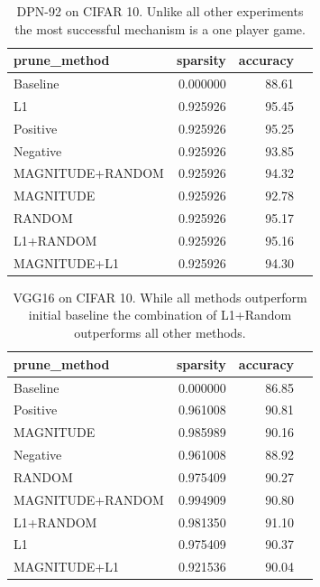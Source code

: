 \documentclass[runningheads]{llncs}
\begin{document}
\begin{table}[h]
\begin{tabular}{|l|r|r|r|}
\hline
     prune\_method &  sparsity &  accuracy \\ \hline
   Baseline  &  0.000000 &     88.61 \\ \hline
               L1 &  0.925926 &     95.45 \\ \hline
         Positive &  0.925926 &     95.25 \\ \hline
         Negative &  0.925926 &     93.85 \\ \hline
 MAGNITUDE+RANDOM &  0.925926 &     94.32 \\ \hline
        MAGNITUDE &  0.925926 &     92.78 \\ \hline
           RANDOM &  0.925926 &     95.17 \\ \hline
        L1+RANDOM &  0.925926 &     95.16 \\ \hline
     MAGNITUDE+L1 &  0.925926 &     94.30 \\ \hline 
\end{tabular}
\label{tab:cifar10-DPN92}
\caption{DPN-92 on CIFAR 10. Unlike all other experiments the most successful mechanism is a one player game.}
\end{table}

\begin{table}[h]
\begin{tabular}{|l|r|r|r|}
\hline
     prune\_method &  sparsity &  accuracy \\ \hline 
     Baseline &  0.000000 &     86.85 \\ \hline
         Positive &  0.961008 &     90.81 \\ \hline
        MAGNITUDE &  0.985989 &     90.16 \\ \hline
         Negative &  0.961008 &     88.92 \\ \hline
           RANDOM &  0.975409 &     90.27 \\ \hline
 MAGNITUDE+RANDOM &  0.994909 &     90.80 \\ \hline
        L1+RANDOM &  0.981350 &     91.10 \\ \hline
               L1 &  0.975409 &     90.37 \\ \hline
     MAGNITUDE+L1 &  0.921536 &     90.04 \\ \hline
\end{tabular}
\label{tab:cifar10-VGG16}
\caption{VGG16 on CIFAR 10. While all methods outperform initial baseline the combination of L1+Random outperforms all other methods.}
\end{table}
\end{document}
